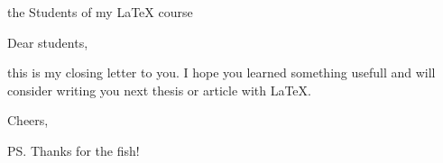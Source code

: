 \documentclass{letter}
\begin{document}
\begin{letter}{the Students of my {\LaTeX} course}
	\opening{Dear students,}

	this is my closing letter to you. I hope you learned something usefull and
	will consider writing you next thesis or article with {\LaTeX}.

	\closing{Cheers,}

	\ps{Thanks for the fish!}

\end{letter}
\end{document}
